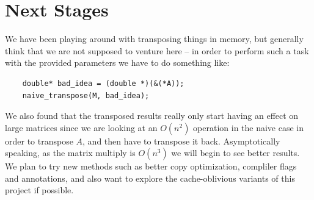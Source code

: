 \documentclass[11pt]{article}
\begin{document}
\section{Next Stages} %

We have been playing around with transposing things in memory, but generally think that we are not supposed to venture here -- in order to perform such a task with the provided parameters we have to do something like:

\begin{lstlisting}
    double* bad_idea = (double *)(&(*A));
    naive_transpose(M, bad_idea);
\end{lstlisting}

\noindent We also found that the transposed results really only start having an effect on large matrices since we are looking at an $O(n^2)$ operation in the naive case in order to transpose $A$, and then have to transpose it back.  Asymptotically speaking, as the matrix multiply is $O(n^3)$ we will begin to see better results.\\

\noindent We plan to try new methods such as better copy optimization, compliler flags and annotations, and also want to explore the cache-oblivious variants of this project if possible.
\end{document}
